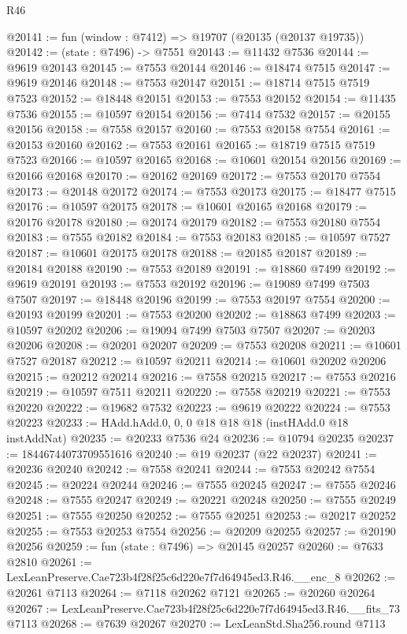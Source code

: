 \begin{lexlean}{R46}
\begin{coremodule}
@20141 := fun (window : @7412) => @19707 (@20135 (@20137 @19735))
@20142 := (state : @7496) -> @7551
@20143 := @11432 @7536
@20144 := @9619 @20143
@20145 := @7553 @20144
@20146 := @18474 @7515
@20147 := @9619 @20146
@20148 := @7553 @20147
@20151 := @18714 @7515 @7519 @7523
@20152 := @18448 @20151
@20153 := @7553 @20152
@20154 := @11435 @7536
@20155 := @10597 @20154
@20156 := @7414 @7532
@20157 := @20155 @20156
@20158 := @7558 @20157
@20160 := @7553 @20158 @7554
@20161 := @20153 @20160
@20162 := @7553 @20161
@20165 := @18719 @7515 @7519 @7523
@20166 := @10597 @20165
@20168 := @10601 @20154 @20156
@20169 := @20166 @20168
@20170 := @20162 @20169
@20172 := @7553 @20170 @7554
@20173 := @20148 @20172
@20174 := @7553 @20173
@20175 := @18477 @7515
@20176 := @10597 @20175
@20178 := @10601 @20165 @20168
@20179 := @20176 @20178
@20180 := @20174 @20179
@20182 := @7553 @20180 @7554
@20183 := @7555 @20182
@20184 := @7553 @20183
@20185 := @10597 @7527
@20187 := @10601 @20175 @20178
@20188 := @20185 @20187
@20189 := @20184 @20188
@20190 := @7553 @20189
@20191 := @18860 @7499
@20192 := @9619 @20191
@20193 := @7553 @20192
@20196 := @19089 @7499 @7503 @7507
@20197 := @18448 @20196
@20199 := @7553 @20197 @7554
@20200 := @20193 @20199
@20201 := @7553 @20200
@20202 := @18863 @7499
@20203 := @10597 @20202
@20206 := @19094 @7499 @7503 @7507
@20207 := @20203 @20206
@20208 := @20201 @20207
@20209 := @7553 @20208
@20211 := @10601 @7527 @20187
@20212 := @10597 @20211
@20214 := @10601 @20202 @20206
@20215 := @20212 @20214
@20216 := @7558 @20215
@20217 := @7553 @20216
@20219 := @10597 @7511 @20211
@20220 := @7558 @20219
@20221 := @7553 @20220
@20222 := @19682 @7532
@20223 := @9619 @20222
@20224 := @7553 @20223
@20233 := HAdd.hAdd.{0, 0, 0} @18 @18 @18 (instHAdd.{0} @18 instAddNat)
@20235 := @20233 @7536 @24
@20236 := @10794 @20235
@20237 := 18446744073709551616
@20240 := @19 @20237 (@22 @20237)
@20241 := @20236 @20240
@20242 := @7558 @20241
@20244 := @7553 @20242 @7554
@20245 := @20224 @20244
@20246 := @7555 @20245
@20247 := @7555 @20246
@20248 := @7555 @20247
@20249 := @20221 @20248
@20250 := @7555 @20249
@20251 := @7555 @20250
@20252 := @7555 @20251
@20253 := @20217 @20252
@20255 := @7553 @20253 @7554
@20256 := @20209 @20255
@20257 := @20190 @20256
@20259 := fun (state : @7496) => @20145 @20257
@20260 := @7633 @2810
@20261 := LexLeanPreserve.Cae723b4f28f25c6d220e7f7d64945ed3.R46.__enc_8
@20262 := @20261 @7113
@20264 := @7118 @20262 @7121
@20265 := @20260 @20264
@20267 := LexLeanPreserve.Cae723b4f28f25c6d220e7f7d64945ed3.R46.__fits_73 @7113
@20268 := @7639 @20267
@20270 := LexLeanStd.Sha256.round @7113

\end{coremodule}
\end{lexlean}
